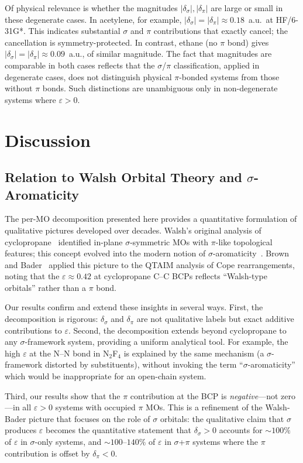 \documentclass[twoside,natbib]{svjour3}
\newcommand{\delsg}{\delta_{\sigma}}
\newcommand{\delpi}{\delta_{\pi}}
\newcommand{\eps}{\varepsilon}
\begin{document}
Of physical relevance is whether the magnitudes
$|\delsg|, |\delpi|$ are large or small in these degenerate cases.
In acetylene, for example, $|\delsg| = |\delpi| \approx 0.18$~a.u.\
at HF/6-31G*. This indicates substantial $\sigma$ and $\pi$ contributions
that exactly cancel; the cancellation is symmetry-protected. In
contrast, ethane (no $\pi$ bond) gives $|\delsg| = |\delpi| \approx 0.09$~a.u.,
of similar magnitude. The fact that magnitudes are comparable in
both cases reflects that the $\sigma$/$\pi$ classification, applied
in degenerate cases, does not distinguish physical $\pi$-bonded
systems from those without $\pi$ bonds. Such distinctions are
unambiguous only in non-degenerate systems where $\eps > 0$.

\section{Discussion}
\label{sec:discussion}

\subsection{Relation to Walsh Orbital Theory and $\sigma$-Aromaticity}

The per-MO decomposition presented here provides a quantitative
formulation of qualitative pictures developed over decades. Walsh's
original analysis of cyclopropane~\citep{Walsh1947} identified
in-plane $\sigma$-symmetric MOs with $\pi$-like topological
features; this concept evolved into the modern notion of
$\sigma$-aromaticity~\citep{Cremer1988,Dewar1984}. Brown and
Bader~\citep{Brown2009} applied this picture to the QTAIM analysis
of Cope rearrangements, noting that the $\eps \approx 0.42$ at
cyclopropane C--C BCPs reflects ``Walsh-type orbitals'' rather
than a $\pi$ bond.

Our results confirm and extend these insights in several ways.
First, the decomposition is rigorous: $\delsg$ and $\delpi$ are not
qualitative labels but exact additive contributions to $\eps$.
Second, the decomposition extends beyond cyclopropane to any
$\sigma$-framework system, providing a uniform analytical tool.
For example, the high $\eps$ at the N--N bond in N$_2$F$_4$ is
explained by the same mechanism (a $\sigma$-framework distorted by
substituents), without invoking the term ``$\sigma$-aromaticity''
which would be inappropriate for an open-chain system.

Third, our results show that the $\pi$ contribution at the BCP is
\emph{negative}---not zero---in all $\eps > 0$ systems with occupied
$\pi$ MOs. This is a refinement of the Walsh-Bader picture that
focuses on the role of $\sigma$ orbitals: the qualitative claim
that $\sigma$ produces $\eps$ becomes the quantitative statement that
$\delsg > 0$ accounts for $\sim 100\%$ of $\eps$ in
$\sigma$-only systems, and $\sim 100$--$140\%$ of $\eps$ in
$\sigma$+$\pi$ systems where the $\pi$ contribution is offset by
$\delpi < 0$.
\end{document}
